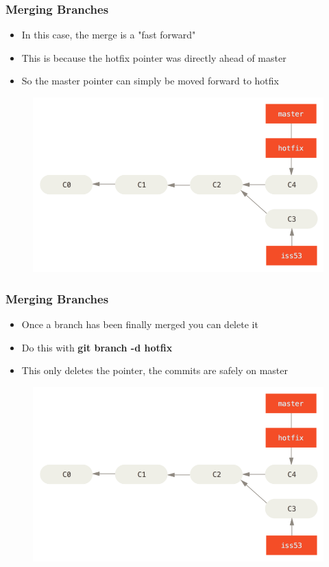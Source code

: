 \documentclass{beamer}
\begin{document}
\begin{frame}
	\frametitle{Merging Branches}
	\begin{itemize}
		\item{In this case, the merge is a "fast forward"}
		\item{This is because the hotfix pointer was directly ahead of master}
		\item{So the master pointer can simply be moved forward to hotfix}
	\end{itemize}
	\begin{figure}
		\includegraphics[scale=0.35]{Merging_Branches-4.png}
	\end{figure}
\end{frame}

\begin{frame}
	\frametitle{Merging Branches}
	\begin{itemize}
		\item{Once a branch has been finally merged you can delete it}
		\item{Do this with \textbf{git branch -d hotfix}}
		\item{This only deletes the pointer, the commits are safely on master}
	\end{itemize}
	\begin{figure}
		\includegraphics[scale=0.35]{Merging_Branches-4.png}
	\end{figure}
\end{frame}
\end{document}
